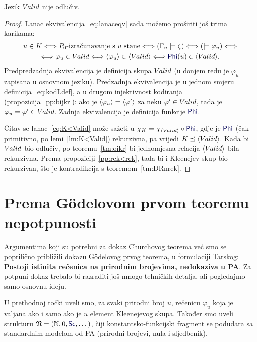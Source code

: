 \begin{propozicija}
Jezik $V\mspace{-1.5mu}alid$ nije odlučiv\!.
\end{propozicija}
\begin{proof}
Lanac ekvivalencija~\eqref{eq:lanaceqv} sada možemo proširiti još trima karikama:
\begin{multline}\label{eq:K<Valid}
    u\in K
    \Longleftrightarrow
    \text{$P_0$-izračunavanje s $u$ stane}
    \Longleftrightarrow
    (\Gamma_u\models\zeta)
    \Longleftrightarrow{}
    (\models\varphi_u)
    \Longleftrightarrow\\
    \Longleftrightarrow
    \varphi_u\in\Valid
    \Longleftrightarrow
    \kr{\varphi_u}\in\kr{\Valid}
    \Longleftrightarrow
    \f{Phi}(u)\in\kr{\Valid}
    \text.
\end{multline}
Predpredzadnja ekvivalencija je definicija skupa $V\mspace{-1.5mu}alid$ (u donjem redu je $\varphi_u$ zapisana u osnovnom jeziku). Predzadnja ekvivalencija je u jednom smjeru definicija~\eqref{eq:kodLdef}, a u drugom injektivnost kodiranja (propozicija~\ref{pp:bijkr}): ako je $\langle\varphi_u\rangle=\langle\varphi'\rangle$ za neku $\varphi'\in V\mspace{-1.5mu}alid$, tada je $\varphi_u=\varphi'\in V\mspace{-1.5mu}alid$. Zadnja ekvivalencija je definicija funkcije $\f{Phi}$.

	Čitav se lanac~\eqref{eq:K<Valid} može sažeti u $\chi_{K}=\chi_{\kr{\Valid}}\circ\f{Phi}$, gdje je $\f{Phi}$ (čak primitivno, po lemi~\ref{lm:K<Valid}) rekurzivna, pa vrijedi $K\preceq\langle V\mspace{-1.5mu}alid\rangle$.
Kada bi $V\mspace{-1.5mu}alid$ bio odlučiv, po teoremu~\ref{tm:oikr} bi jednomjesna relacija $\langle V\mspace{-1.5mu}alid\rangle$ bila rekurzivna. Prema propoziciji~\ref{pp:rek<rek}, tada bi i Kleenejev skup bio rekurzivan, što je kontradikcija s teoremom~\ref{tm:DRnrek}.
\end{proof}

\section{Prema Gödelovom prvom teoremu nepotpunosti}

Argumentima koji su potrebni za dokaz Churchovog teorema već smo se poprilično približili dokazu Gödelovog prvog teorema, u formulaciji Tarskog: \textbf{Postoji istinita rečenica na prirodnim brojevima, nedokaziva u PA\@}. Za potpuni dokaz trebalo bi razraditi još mnogo tehničkih detalja, ali pogledajmo samo osnovnu ideju.

U prethodnoj točki uveli smo, za svaki prirodni broj $u$, rečenicu $\varphi_u$ koja je valjana ako i samo ako je $u$ element Kleenejevog skupa. Također smo uveli strukturu $\mathfrak N=(\N,0,\f{Sc},\dotsc)$, čiji konstantsko-funkcijski fragment se podudara sa standardnim modelom od PA (prirodni brojevi, nula i sljedbenik).

